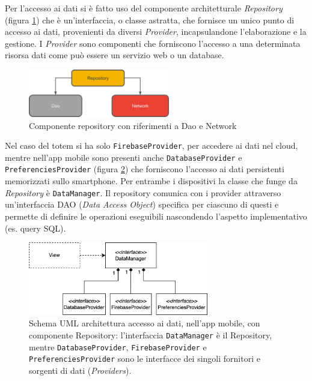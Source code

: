 Per l'accesso ai dati si è fatto uso del componente architetturale \textit{Repository} \cite{repositoryComponent} (figura \ref{fig:repository}) che è un'interfaccia, o classe astratta, che fornisce un unico punto di accesso ai dati, provenienti da diversi \textit{Provider}, incapsulandone l'elaborazione e la gestione. I \textit{Provider} sono componenti che forniscono l'accesso a una determinata risorsa dati come può essere un servizio web o un database.
\begin{figure}[h]
    \centering
    \includegraphics[width=0.55\textwidth]{img/repository.png}
    \caption{Componente repository con riferimenti a Dao e Network \cite{repositoryComponent}}
    \label{fig:repository}
\end{figure}
Nel caso del totem si ha solo \texttt{FirebaseProvider}, per accedere ai dati nel cloud, mentre nell'app mobile sono presenti anche \texttt{DatabaseProvider} e \texttt{PreferenciesProvider} (figura \ref{fig:repositorySchemaAPP}) che forniscono l'accesso ai dati persistenti memorizzati sullo smartphone. Per entrambe i dispositivi la classe che funge da \textit{Repository} è \texttt{DataManager}.
Il repository comunica con i provider attraverso un'interfaccia DAO (\textit{Data Access Object}) specifica per ciascuno di questi e permette di definire le operazioni eseguibili nascondendo l'aspetto implementativo (es. query SQL).
\begin{figure}[h]
    \centering
    \includegraphics[width=0.7\textwidth]{img/app/repository_pattern_scheme.png}
    \caption{Schema UML architettura accesso ai dati, nell'app mobile, con componente Repository: l'interfaccia \texttt{DataManager} è il Repository, mentre \texttt{DatabaseProvider}, \texttt{FirebaseProvider} e \texttt{PreferenciesProvider} sono le interfacce dei singoli fornitori e sorgenti di dati (\textit{Providers}).}
    \label{fig:repositorySchemaAPP}
\end{figure}
\newpage
